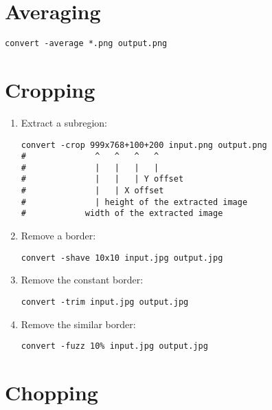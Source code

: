 \section{Averaging}

\begin{lstlisting}
convert -average *.png output.png
\end{lstlisting}


\section{Cropping}

\begin{enumerate}

\item Extract a subregion:

\begin{lstlisting}
convert -crop 999x768+100+200 input.png output.png
#              ^   ^   ^   ^
#              |   |   |   |
#              |   |   | Y offset
#              |   | X offset
#              | height of the extracted image
#            width of the extracted image
\end{lstlisting}

\item Remove a border:

\begin{lstlisting}
convert -shave 10x10 input.jpg output.jpg
\end{lstlisting}

\item Remove the constant border:

\begin{lstlisting}
convert -trim input.jpg output.jpg
\end{lstlisting}

\item Remove the similar border:

\begin{lstlisting}
convert -fuzz 10% input.jpg output.jpg
\end{lstlisting}

\end{enumerate}


\section{Chopping}

